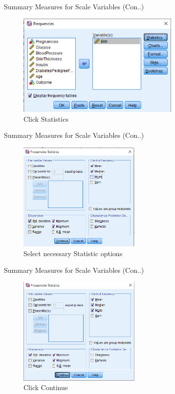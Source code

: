 \begin{frame}[t]{Summary Measures for Scale Variables (Con..)}
	\begin{figure}
		\centering
		\includegraphics[width=8cm]{img/1111113}
		\caption{Click Statistics}
	\end{figure}
\end{frame}
\begin{frame}[t]{Summary Measures for Scale Variables (Con..)}
	\begin{figure}
		\centering
		\includegraphics[width=6cm]{img/1111114}
		\caption{Select necessary Statistic options}
	\end{figure}
\end{frame}
\begin{frame}[t]{Summary Measures for Scale Variables (Con..)}
	\begin{figure}
		\centering
		\includegraphics[width=6cm]{img/1111115}
		\caption{Click Continue}
	\end{figure}
\end{frame}
